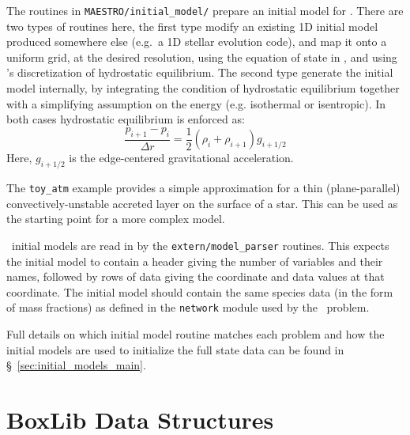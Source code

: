 The routines in {\tt MAESTRO/initial\_model/} prepare an initial model
for \maestro.  There are two types of routines here, the first type
modify an existing 1D initial model produced somewhere else (e.g.\ a
1D stellar evolution code), and map it onto a uniform grid, at
the desired resolution, using the equation of state in \maestro, and
using \maestro's discretization of hydrostatic equilibrium.  The second
type generate the initial model internally, by integrating the
condition of hydrostatic equilibrium together with a simplifying
assumption on the energy (e.g. isothermal or isentropic).  In
both cases hydrostatic equilibrium is enforced as:
\begin{equation}
\frac{p_{i+1} - p_i}{\Delta r} = \frac{1}{2} (\rho_i + \rho_{i+1})
g_{i+1/2}
\end{equation}
Here, $g_{i+1/2}$ is the edge-centered gravitational acceleration.

The {\tt toy\_atm} example provides a simple approximation for a thin
(plane-parallel) convectively-unstable accreted layer on the surface
of a star.  This can be used as the starting point for a more complex
model.  

\maestro\ initial models are read in by the {\tt extern/model\_parser}
routines.  This expects the initial model to contain a header giving
the number of variables and their names, followed by rows of data
giving the coordinate and data values at that coordinate.  The initial
model should contain the same species data (in the form of mass fractions) as
defined in the {\tt network} module used by the \maestro\ problem.

Full details on which initial model routine matches each problem and
how the initial models are used to initialize the full state data can
be found in \S~\ref{sec:initial_models_main}.



\section{BoxLib Data Structures}

